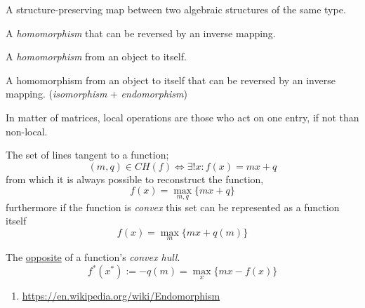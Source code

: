 





\begin{multicols}{3}
  A structure-preserving map between two algebraic structures of the same type.

  A \textit{homomorphism} that can be reversed by an inverse mapping.

  A \textit{homomorphism} from an object to itself.

  A homomorphism from an object to itself that can be reversed by an inverse mapping.
  (\textit{isomorphism} + \textit{endomorphism})

  In matter of matrices, local operations are those who act on one entry, if not than non-local.

  The set of lines tangent to a function;
  \begin{equation}
    \label{eq:convex-hull}
    (m, q) \in CH(f) \iff \exists!x : f(x) = mx + q
  \end{equation}
  from which it is always possible to reconstruct the function,
  \begin{equation}
    f(x) = \max_{m, q}\{mx + q\}
  \end{equation}
  furthermore if the function is \textit{convex} this set can be
  represented as a function itself
  \begin{equation}
    f(x) = \max_{m}\{mx + q(m)\}
  \end{equation}

  The \underline{opposite} of a function's \textit{convex hull}.
  \begin{equation}
    \label{eq:legendre-transform}
    f^*(x^*):= -q(m) = \max_{x}\{mx - f(x)\}
  \end{equation}

\end{multicols}


\begin{enumerate}
\item \url{https://en.wikipedia.org/wiki/Endomorphism}
\end{enumerate}


